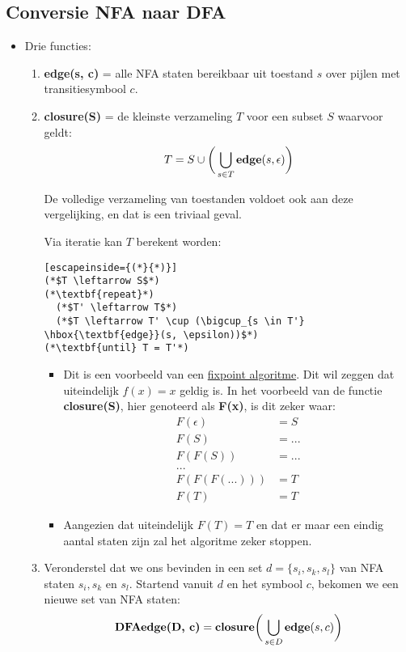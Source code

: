 \subsection{Conversie NFA naar DFA}
\begin{itemize}
	\item Drie functies:
	\begin{enumerate}
		\item \textbf{edge(s, c)} = alle NFA staten bereikbaar uit toestand $s$ over pijlen met transitiesymbool $c$.
		\item \textbf{closure(S)} = de kleinste verzameling $T$ voor een subset $S$ waarvoor geldt:
		$$
		T = S \cup \bigg(\bigcup_{s \in T} \hbox{\textbf{edge}}(s, \epsilon)\bigg)
		$$
		
		{De volledige verzameling van toestanden voldoet ook aan deze vergelijking, en dat is een triviaal geval.}
		
		Via iteratie kan $T$ berekent worden:
			\begin{lstlisting}[escapeinside={(*}{*)}]
(*$T \leftarrow S$*)
(*\textbf{repeat}*)
  (*$T' \leftarrow T$*)
  (*$T \leftarrow T' \cup (\bigcup_{s \in T'} \hbox{\textbf{edge}}(s, \epsilon))$*)
(*\textbf{until} T = T'*)
			\end{lstlisting}
			
		\begin{itemize}
			\item Dit is een voorbeeld van een \underline{fixpoint algoritme}. Dit wil zeggen dat uiteindelijk $f(x) = x$ geldig is. In het voorbeeld van de functie \textbf{closure(S)}, hier genoteerd als \textbf{F(x)}, is dit zeker waar:
			\begin{equation*}
				\begin{split}
					F(\epsilon) & = S \\
					F(S) & = ... \\
					F(F(S)) & = ...\\
					...\\
					F(F(F(...))) & = T \\
					F(T) & = T
				\end{split}
			\end{equation*}
			\item Aangezien dat uiteindelijk $F(T) = T$ en dat er maar een eindig aantal staten zijn zal het algoritme zeker stoppen.
		\end{itemize}
	
		\item Veronderstel dat we ons bevinden in een set $d = \{s_i, s_k, s_l\}$ van NFA staten $s_i, s_k$ en $s_l$. Startend vanuit $d$ en het symbool $c$, bekomen we een nieuwe set van NFA staten:
		$$\hbox{\textbf{DFAedge(D, c)}} = \hbox{\textbf{closure}}\bigg(\bigcup_{s \in D} \hbox{\textbf{edge}}(s, c)\bigg)$$
		

\end{enumerate}
\end{itemize}

